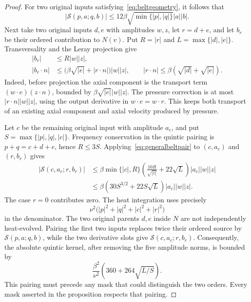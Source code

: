 \documentclass[11pt]{article}
\begin{document}
\begin{proof}
For two original inputs satisfying~\eqref{eq:beltgeometry}, it follows that
\begin{equation}\label{eq:firstbeltpair}
 |\mathcal S(p,a;q,b)|\leq
       12\beta\sqrt{\min\{|p|,|q|\}}|a||b|.
\end{equation}
Next take two original inputs $d,e$ with amplitudes $w,z$, let $r=d+e$,
and let $b_r$ be their ordered contribution to $N(v)$. Put
$R=|r|$ and $L=\max\{|d|,|e|\}$. Transversality and the Leray
projection give
\begin{align}
 |b_r|&\leq R|w||z|,\label{eq:generatedbelt}\\
 |b_r\cdot n|&\leq
  \bigl(\beta\sqrt{|e|}+|r\cdot n|\bigr)|w||z|,\qquad
 |r\cdot n|\leq\beta(\sqrt{|d|}+\sqrt{|e|}).\nonumber
\end{align}
Indeed, before projection the axial component is the transport term
$(w\cdot e)(z\cdot n)$, bounded by
$\beta\sqrt{|e|}|w||z|$. The pressure correction is at most
$|r\cdot n||w||z|$, using the output derivative in
$w\cdot e=w\cdot r$. This keeps both transport of an existing axial
component and axial velocity produced by pressure.

Let $c$ be the remaining original input with amplitude $a_c$, and put
$S=\max\{|p|,|q|,|c|\}$. Frequency conservation in the quintic
pairing is $p+q=c+d+e$, hence $R\leq3S$.
Applying~\eqref{eq:generalbeltpair} to $(c,a_c)$ and $(r,b_r)$ gives
\begin{align*}
 |\mathcal S(c,a_c;r,b_r)|
 &\leq\beta\min\{|c|,R\}
       \left(\frac{10R}{\sqrt{|c|}}+22\sqrt L\right)
                       |a_c||w||z|\\
 &\leq\beta(30S^{3/2}+22S\sqrt L)|a_c||w||z|.
\end{align*}
The case $r=0$ contributes zero. The heat integration uses precisely
\[
 \nu^2\bigl(|p|^2+|q|^2+|c|^2+|r|^2\bigr)
\]
in the denominator. The two original parents $d,e$ inside $N$ are
not independently heat-evolved. Pairing the first two inputs replaces
twice their ordered source by $\mathcal S(p,a;q,b)$, while the
two derivative slots give $\mathcal S(c,a_c;r,b_r)$. Consequently,
the absolute quintic kernel, after removing the five amplitude norms,
is bounded by
\begin{equation}\label{eq:beltfivekernel}
 \frac{\beta^2}{\nu^2}
                   \left(360+264\sqrt{L/S}\right).
\end{equation}
This pairing must precede any mask that could distinguish the two
orders. Every mask asserted in the proposition respects that pairing.


\end{proof}
\end{document}
